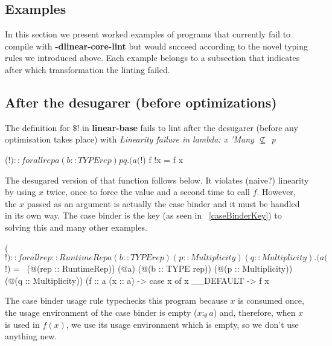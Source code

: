 \documentclass[a4paper, draft]{article}
\begin{document}
\begin{code}


\section{Examples\label{examples}}

In this section we present worked examples of programs that currently fail to
compile with \textbf{-dlinear-core-lint} but would succeed according to the
novel typing rules we introduced above. Each example belongs to a subsection
that indicates after which transformation the linting failed.

\subsection{After the desugarer (before optimizations)}

The definition for $\$!$ in \textbf{linear-base}\cite{} fails to lint after the
desugarer (before any optimisation takes place) with \emph{Linearity failure in
lambda: x 'Many $\not\subseteq$ p}
\begin{code}
($!) :: forall {rep} a (b :: TYPE rep) p q. (a %
($!) f !x = f x
\end{code}

The desugared version of that function follows below. It violates (naive?)
linearity by using $x$ twice, once to force the value and a second time to call
$f$. However, the $x$ passed as an argument is actually the case binder and it
must be handled in its own way. The case binder is the key (as seen in ~\ref{caseBinderKey}) to solving this
and many other examples.
\begin{code}
($!)
  :: forall {rep :: RuntimeRep} a (b :: TYPE rep) (p :: Multiplicity)
            (q :: Multiplicity).
     (a %
($!)
  = \ (@(rep :: RuntimeRep))
      (@a)
      (@(b :: TYPE rep))
      (@(p :: Multiplicity))
      (@(q :: Multiplicity))
      (f :: a %
      (x :: a) ->
      case x of x { __DEFAULT -> f x }
\end{code}

%
The case binder usage rule typechecks this program because $x$ is consumed once,
the usage environment of the case binder is empty ($x :_\emptyset a$) and,
therefore, when $x$ is used in $f(x)$, we use its usage environment which is
empty, so we don't use anything new.


\end{code}
\end{document}
